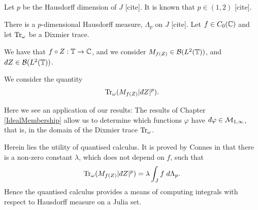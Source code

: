 Let $p$ be the Hausdorff dimension of $J$ [cite]. It is known that $p \in (1,2)$ [cite].

There is a $p$-dimensional Hausdorff measure, $\Lambda_p$ on $J$ [cite].
Let
$f\in C_0(\mathbb{C})$ and let $\operatorname{Tr}_\omega$
be a Dixmier trace. 

We have that $f\circ Z :\mathbb{T}\to \mathbb{C}$, and we consider $M_{f(Z)} \in \mathcal{B}(L^2(\mathbb{T}))$,
and $\qd Z \in \mathcal{B}(L^2(\Circ))$.

We consider the quantity
\begin{equation}
    \Tr_\omega(M_{f(Z)}|\qd Z|^p).
\end{equation}


Here we see an application of our results: The results of Chapter \ref{IdealMembership}
allow us to determine which functions $\varphi$ have $\qd \varphi\in \M_{1,\infty}$,
that is, in the domain of the Dixmier trace $\operatorname{Tr}_\omega$.

Herein lies the utility
of quantised calculus.
It is proved by Connes in \cite[Ch. 4, Thm 17]{Connes94} that there is a non-zero constant $\lambda$,
which does not depend on $f$, such that
\begin{equation}
    \Tr_\omega(M_{f(Z)}|\qd Z|^p) = \lambda \int_J f\;d\Lambda_p.
\end{equation}
Hence the quantised calculus provides a means of computing integrals
with respect to Hausdorff measure on a Julia set.
